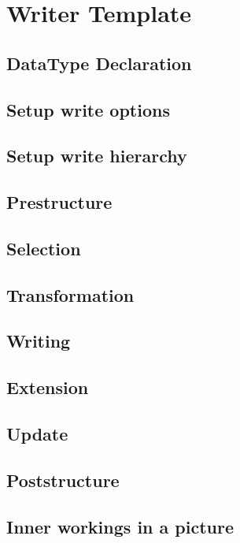 \chapter{Writer Template}

\section{DataType Declaration}

\section{Setup write options}

\section{Setup write hierarchy}

\section{Prestructure}

\section{Selection}

\section{Transformation}

\section{Writing}

\section{Extension}

\section{Update}

\section{Poststructure}

\section{Inner workings in a picture}

